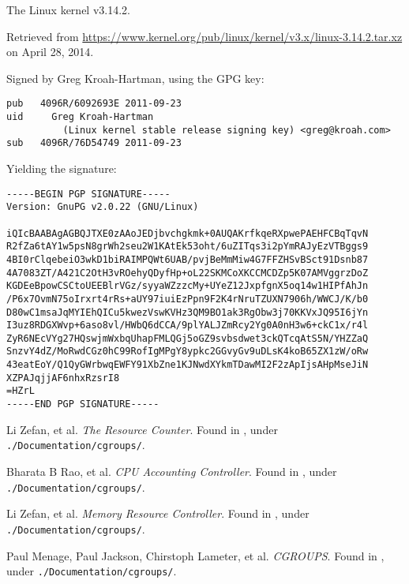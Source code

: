 \begin{thebibliography}{9}
The Linux kernel v3.14.2.

Retrieved from
\url{https://www.kernel.org/pub/linux/kernel/v3.x/linux-3.14.2.tar.xz} on April
28, 2014.

Signed by Greg Kroah-Hartman, using the GPG key:

\begin{lstlisting}
pub   4096R/6092693E 2011-09-23
uid     Greg Kroah-Hartman
          (Linux kernel stable release signing key) <greg@kroah.com>
sub   4096R/76D54749 2011-09-23
\end{lstlisting}

Yielding the signature:

\begin{lstlisting}
-----BEGIN PGP SIGNATURE-----
Version: GnuPG v2.0.22 (GNU/Linux)

iQIcBAABAgAGBQJTXE0zAAoJEDjbvchgkmk+0AUQAKrfkqeRXpwePAEHFCBqTqvN
R2fZa6tAY1w5psN8grWh2seu2W1KAtEk53oht/6uZITqs3i2pYmRAJyEzVTBggs9
4BI0rClqebeiO3wkD1biRAIMPQWt6UAB/pvjBeMmMiw4G7FFZHSvBSct91Dsnb87
4A7083ZT/A421C2OtH3vROehyQDyfHp+oL22SKMCoXKCCMCDZp5K07AMVggrzDoZ
KGDEeBpowCSCtoUEEBlrVGz/syyaWZzzcMy+UYeZ12JxpfgnX5oq14w1HIPfAhJn
/P6x7OvmN75oIrxrt4rRs+aUY97iuiEzPpn9F2K4rNruTZUXN7906h/WWCJ/K/b0
D80wC1msaJqMYIEhQICu5kwezVswKVHz3QM9BO1ak3RgObw3j70KKVxJQ95I6jYn
I3uz8RDGXWvp+6aso8vl/HWbQ6dCCA/9plYALJZmRcy2Yg0A0nH3w6+ckC1x/r4l
ZyR6NEcVYg27HQswjmWxbqUhapFMLQGj5oGZ9svbsdwet3ckQTcqAtS5N/YHZZaQ
SnzvY4dZ/MoRwdCGz0hC99RofIgMPgY8ypkc2GGvyGv9uDLsK4koB65ZX1zW/oRw
43eatEoY/Q1QyGWrbwqEWFY91XbZne1KJNwdXYkmTDawMI2F2zApIjsAHpMseJiN
XZPAJqjjAF6nhxRzsrI8
=HZrL
-----END PGP SIGNATURE-----
\end{lstlisting}


Li Zefan, et al.  \emph{The Resource Counter}. Found in
\cite{linux-kernel-v3.14.2}, under \texttt{./Documentation/cgroups/}.


Bharata B Rao, et al. \emph{CPU Accounting Controller}.  Found in
\cite{linux-kernel-v3.14.2}, under \texttt{./Documentation/cgroups/}.


Li Zefan, et al.  \emph{Memory Resource Controller}. Found in
\cite{linux-kernel-v3.14.2}, under \texttt{./Documentation/cgroups/}.


Paul Menage, Paul Jackson, Chirstoph Lameter, et al. \emph{CGROUPS}.  Found in
\cite{linux-kernel-v3.14.2}, under \texttt{./Documentation/cgroups/}.


\end{thebibliography}
